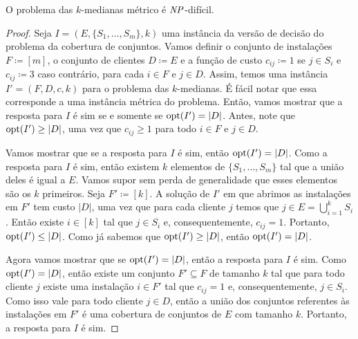 \begin{theorem}
O problema das $k$-medianas métrico é $\mathit{NP}$-difícil.
\end{theorem}
\begin{proof}
Seja $I = (E,\{S_1,\ldots,S_m\},k)$ uma instância da versão de decisão do problema da cobertura de conjuntos. Vamos definir o conjunto de instalações $F \coloneqq [m]$, o conjunto de clientes $D \coloneqq E$ e a função de custo $c_{ij} \coloneqq 1$ se $j \in S_i$ e $c_{ij} \coloneqq 3$ caso contrário, para cada $i \in F$ e $j \in D$. Assim, temos uma instância $I' = (F,D,c,k)$ para o problema das $k$-medianas. É fácil notar que essa corresponde a uma instância métrica do problema. Então, vamos mostrar que a resposta para $I$ é sim se e somente se $\mathrm{opt}(I') = |D|$. Antes, note que $\mathrm{opt}(I') \geq |D|$, uma vez que $c_{ij} \geq 1$ para todo $i \in F$ e $j\in D$.

Vamos mostrar que se a resposta para $I$ é sim, então $\mathrm{opt}(I') = |D|$. Como a resposta para $I$ é sim, então existem $k$ elementos de $\{S_1,\ldots,S_m\}$ tal que a união deles é igual a $E$. Vamos supor sem perda de generalidade que esses elementos são os $k$ primeiros. Seja $F' \coloneqq [k]$. A solução de $I'$ em que abrimos as instalações em $F'$ tem custo $|D|$, uma vez que para cada cliente $j$ temos que $j \in E = \bigcup_{i= 1}^k S_i$. Então existe $i \in [k]$ tal que $j \in S_i$ e, consequentemente, $c_{ij} = 1$. Portanto, $\mathrm{opt}(I') \leq |D|$. Como já sabemos que $\mathrm{opt}(I') \geq |D|$, então $\mathrm{opt}(I') = |D|$.

Agora vamos mostrar que se $\mathrm{opt}(I') = |D|$, então a resposta para $I$ é sim. Como $\mathrm{opt}(I') = |D|$, então existe um conjunto $F' \subseteq F$ de tamanho $k$ tal que para todo cliente $j$ existe uma instalação $i \in F'$ tal que $c_{ij} = 1$ e, consequentemente, $j \in S_i$. Como isso vale para todo cliente $j \in D$, então a união dos conjuntos referentes às instalações em $F'$ é uma cobertura de conjuntos de $E$ com tamanho $k$. Portanto, a resposta para $I$ é sim.
\end{proof}